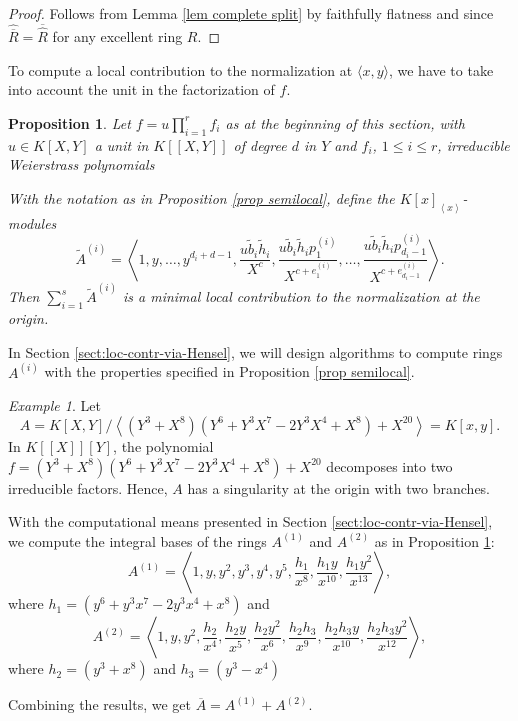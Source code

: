 \documentclass[a4paper,11pt]{amsart}%
\theoremstyle{definition}
\theoremstyle{plain}
\newtheorem{proposition}[defn]{Proposition}
\theoremstyle{remark}
\newtheorem{example}[defn]{Example}
\begin{document}
\begin{proof}
Follows from Lemma \ref{lem complete split} by faithfully flatness and since
$\widehat{\overline{R}}=\overline{\widehat{R}}$ for any excellent ring $R$.
\end{proof}

To compute a local contribution to the normalization at $\langle x, y\rangle$, we have to take into account the unit in the factorization of $f$.

\begin{proposition}
\label{prop local contribution} Let $f = u \prod_{i=1}^r f_i$ as at the beginning of this section, with $u \in K[X, Y]$ a unit in $K[[X, Y]]$ of degree $d$ in $Y$  and $f_i$, $1 \le i \le r$, irreducible Weierstrass polynomials

With the notation as in Proposition \ref{prop semilocal},
define the $K[x]_{\left\langle x\right\rangle }$-modules%
\[
\tilde A^{(i)}=\left\langle 1,y,\dots, y^{d_i+d-1},\frac{u\tilde{b}_{i}\tilde{h}_{i}}{X^{c}},\frac{u\tilde
{b}_{i}\tilde{h}_{i}p_{1}^{(i)}}{X^{c+e_{1}^{(i)}}},\ldots,\frac{u\tilde{b}%
_{i}\tilde{h}_{i}p_{d_{i}-1}^{(i)}}{X^{c+e_{d_{i}-1}^{(i)}}}\right\rangle
\text{.}%
\]
Then $\sum_{i=1}^{s}\tilde A^{(i)}$ is a minimal local contribution to the normalization at the origin.
\end{proposition}

In Section \ref{sect:loc-contr-via-Hensel}, we will design algorithms to
compute rings $A^{(i)}$ with the properties specified in Proposition
\ref{prop semilocal}. 

\begin{example}
\label{exampleTwoBranches} Let
\[
A = K[X,Y]/\left\langle (Y^3+X^8)(Y^6 + Y^3X^7 - 2Y^3X^4 + X^8) + X^{20}\right\rangle
=K[x,y]\text{.}%
\]
In $K[[X]][Y]$, the polynomial $f =  (Y^3+X^8)(Y^6 + Y^3X^7 - 2Y^3X^4 + X^8) + X^{20}$
decomposes into two irreducible factors. Hence, $A$ has a singularity at the
origin with two branches.

With the computational means presented in Section
\ref{sect:loc-contr-via-Hensel}, we compute the integral bases of the rings $A^{(1)}$ and $A^{(2)}$ as
in Proposition \ref{prop local contribution}:
\[
A^{(1)}=\left\langle 1, y, y^2, y^3, y^4, y^5, 
\frac{h_1}{x^8}, \frac{h_1 y}{x^{10}}, \frac{h_1 y^2}{x^{13}} \right\rangle,
\]
where $h_1 = (y^6+y^3x^7-2y^3x^4+x^8)$ and 
\[
A^{(2)}=\left\langle 1, y, y^2, \frac{h_2}{x^4}, \frac{h_2 y}{x^5}, \frac{h_2 y^2}{x^6}, 
\frac{h_2 h_3}{x^9}, \frac{h_2 h_3 y}{x^{10}}, \frac{h_2 h_3 y^2}{x^{12}}\right\rangle,
\]
where $h_2 = (y^3 + x^8)$ and $h_3 = (y^3-x^4)$

Combining the results, we get $\overline {A}=A^{(1)}+A^{(2)}$.  
\end{example}
\end{document}
